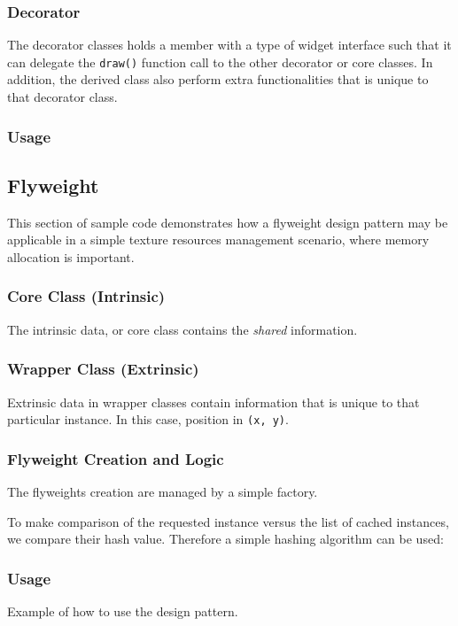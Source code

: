 \subsubsection{Decorator}
The decorator classes holds a member with a type of widget interface such that it can delegate the \texttt{draw()} function call to the other decorator or core classes. In addition, the derived class also perform extra functionalities that is unique to that decorator class.

\subsubsection{Usage}


\subsection{Flyweight}\label{code:flyweight}
This section of sample code demonstrates how a flyweight design pattern may be applicable in a simple texture resources management scenario, where memory allocation is important.
\subsubsection{Core Class (Intrinsic)}
The intrinsic data, or core class contains the \textit{shared} information.

\subsubsection{Wrapper Class (Extrinsic)}
Extrinsic data in wrapper classes contain information that is unique to that particular instance. In this case, position in \texttt{(x, y)}.

\subsubsection{Flyweight Creation and Logic}
The flyweights creation are managed by a simple factory.

To make comparison of the requested instance versus the list of cached instances, we compare their hash value. Therefore a simple hashing algorithm can be used:

\subsubsection{Usage}
Example of how to use the design pattern.



